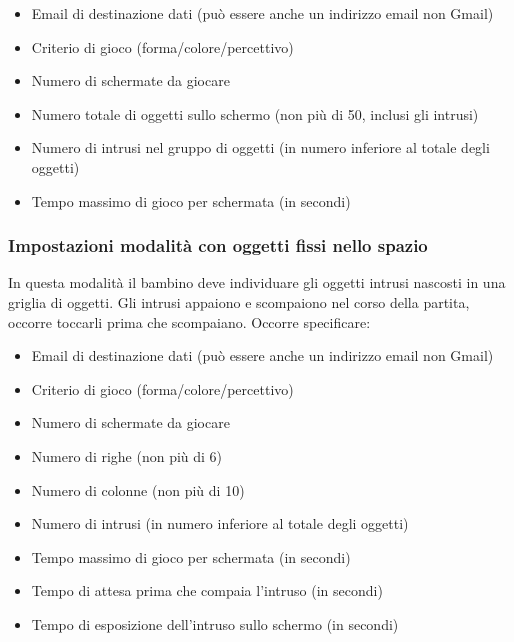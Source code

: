 \begin{itemize}
\item Email di destinazione dati (può essere anche un indirizzo email non Gmail)
\item Criterio di gioco (forma/colore/percettivo)
\item Numero di schermate da giocare
\item Numero totale di oggetti sullo schermo (non più di 50, inclusi gli intrusi)
\item Numero di intrusi nel gruppo di oggetti (in numero inferiore al totale degli oggetti)
\item Tempo massimo di gioco per schermata (in secondi)
\end{itemize}

\subsubsection{Impostazioni modalità con oggetti fissi nello spazio}
In questa modalità il bambino deve individuare gli oggetti intrusi nascosti in una griglia di oggetti. Gli intrusi appaiono e scompaiono nel corso della partita, occorre toccarli prima che scompaiano. 
Occorre specificare:

\begin{itemize}
\item Email di destinazione dati (può essere anche un indirizzo email non Gmail)
\item Criterio di gioco (forma/colore/percettivo)
\item Numero di schermate da giocare
\item Numero di righe (non più di 6)
\item Numero di colonne (non più di 10)
\item Numero di intrusi (in numero inferiore al totale degli oggetti)
\item Tempo massimo di gioco per schermata (in secondi)
\item Tempo di attesa prima che compaia l'intruso (in secondi)
\item Tempo di esposizione dell'intruso sullo schermo (in secondi)
\end{itemize}
